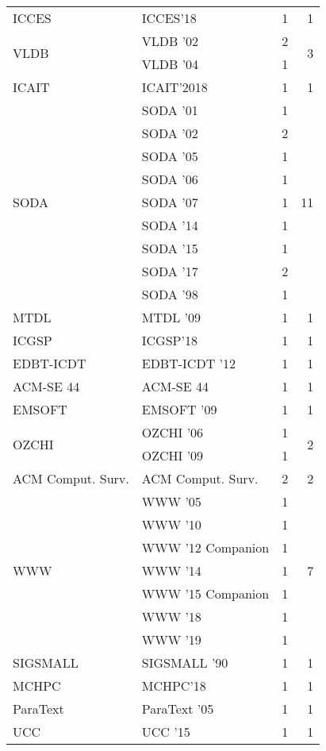 \begin{table*}[t]
\begin{tabular}{llrr}
\multirow{1}{*}{ICCES} & ICCES'18 & 1 & \multirow{1}{*}{1}\\
\multirow{2}{*}{VLDB } & VLDB '02 & 2 & \multirow{2}{*}{3}\\
& VLDB '04 & 1 &\\
\multirow{1}{*}{ICAIT} & ICAIT'2018 & 1 & \multirow{1}{*}{1}\\
\multirow{9}{*}{SODA } & SODA '01 & 1 & \multirow{9}{*}{11}\\
& SODA '02 & 2 &\\
& SODA '05 & 1 &\\
& SODA '06 & 1 &\\
& SODA '07 & 1 &\\
& SODA '14 & 1 &\\
& SODA '15 & 1 &\\
& SODA '17 & 2 &\\
& SODA '98 & 1 &\\
\multirow{1}{*}{MTDL } & MTDL '09 & 1 & \multirow{1}{*}{1}\\
\multirow{1}{*}{ICGSP} & ICGSP'18 & 1 & \multirow{1}{*}{1}\\
\multirow{1}{*}{EDBT-ICDT } & EDBT-ICDT '12 & 1 & \multirow{1}{*}{1}\\
\multirow{1}{*}{ACM-SE 44} & ACM-SE 44 & 1 & \multirow{1}{*}{1}\\
\multirow{1}{*}{EMSOFT } & EMSOFT '09 & 1 & \multirow{1}{*}{1}\\
\multirow{2}{*}{OZCHI } & OZCHI '06 & 1 & \multirow{2}{*}{2}\\
& OZCHI '09 & 1 &\\
\multirow{1}{*}{ACM Comput. Surv.} & ACM Comput. Surv. & 2 & \multirow{1}{*}{2}\\
\multirow{7}{*}{WWW } & WWW '05 & 1 & \multirow{7}{*}{7}\\
& WWW '10 & 1 &\\
& WWW '12 Companion & 1 &\\
& WWW '14 & 1 &\\
& WWW '15 Companion & 1 &\\
& WWW '18 & 1 &\\
& WWW '19 & 1 &\\
\multirow{1}{*}{SIGSMALL } & SIGSMALL '90 & 1 & \multirow{1}{*}{1}\\
\multirow{1}{*}{MCHPC} & MCHPC'18 & 1 & \multirow{1}{*}{1}\\
\multirow{1}{*}{ParaText } & ParaText '05 & 1 & \multirow{1}{*}{1}\\
\multirow{1}{*}{UCC } & UCC '15 & 1 & \multirow{1}{*}{1}\\

\end{tabular}
\end{table*}
